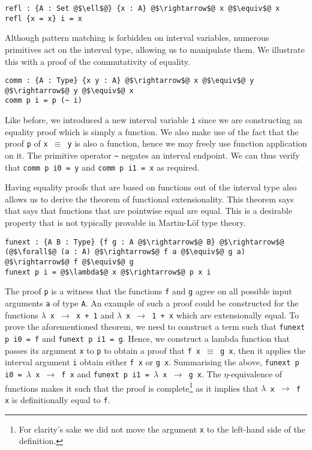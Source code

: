 \documentclass[12pt,twoside,maitrise]{dms}
\theoremstyle{definition}
\numberwithin{equation}{section}
\numberwithin{table}{chapter}
\numberwithin{figure}{chapter}
\newcommand\id[1] {\texttt{#1}}
\newcommand\fn[1] {\texttt{#1}}
\begin{document}
\begin{verbatim}
refl : {A : Set @$\ell$@} {x : A} @$\rightarrow$@ x @$\equiv$@ x
refl {x = x} i = x
\end{verbatim}

Although pattern matching is forbidden on interval variables, numerous primitives
act on the interval type, allowing us to manipulate them. We illustrate this with
a proof of the commutativity of equality.

\begin{verbatim}
comm : {A : Type} {x y : A} @$\rightarrow$@ x @$\equiv$@ y @$\rightarrow$@ y @$\equiv$@ x
comm p i = p (~ i)
\end{verbatim}

Like before, we introduced a new interval variable \id{i} since we are
constructing an equality proof which is simply a function. We also make use of
the fact that the proof \id{p} of \fn{x $\equiv$ y} is also a function, hence we
may freely use function application on it. The primitive operator \id{\~{}}
negates an interval endpoint. We can thus verify that \fn{comm p i0 = y} and
\fn{comm p i1 = x} as required.

Having equality proofs that are based on functions out of the interval type also
allows us to derive the theorem of functional extensionality. This theorem says
that says that functions that are pointwise equal are equal. This is a desirable
property that is not typically provable in Martin-Löf type
theory\cite{martin1975intuitionistic}.

\begin{verbatim}
funext : {A B : Type} {f g : A @$\rightarrow$@ B} @$\rightarrow$@ (@$\forall$@ (a : A) @$\rightarrow$@ f a @$\equiv$@ g a) @$\rightarrow$@ f @$\equiv$@ g
funext p i = @$\lambda$@ x @$\rightarrow$@ p x i
\end{verbatim}

The proof \id{p} is a witness that the functions \id{f} and \id{g} agree on all
possible input arguments \id{a} of type \id{A}. An example of such a proof could
be constructed for the functions \fn{$\lambda$ x $\rightarrow$ x + 1} and
\fn{$\lambda$ x $\rightarrow$ 1 + x} which are extensionally equal. To prove the
aforementioned theorem, we need to construct a term such that \fn{funext p i0 =
  f} and \fn{funext p i1 = g}. Hence, we construct a lambda function that passes
its argument \id{x} to \id{p} to obtain a proof that \fn{f x $\equiv$ g x}, then
it applies the interval argument \id{i} obtain either \fn{f x} or \fn{g x}.
Summarising the above, \fn{funext p i0 = $\lambda$ x $\rightarrow$ f x} and
\fn{funext p i1 = $\lambda$ x $\rightarrow$ g x}. The $\eta$-equivalence of
functions makes it such that the proof is complete\footnote{For clarity's sake
we did not move the argument \id{x} to the left-hand side of the definition.} as
it implies that \fn{$\lambda$ x $\rightarrow$ f x} is definitionally equal to
\id{f}.
\end{document}
